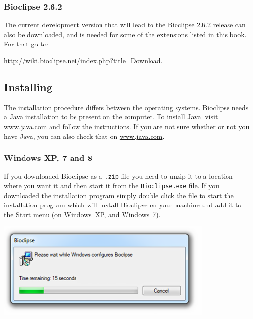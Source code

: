 \documentclass[a5paper, 10pt]{memoir}
\begin{document}
\begin{refsection}
\subsubsection{Bioclipse 2.6.2}

The current development version that will lead to the Bioclipse 2.6.2 release
can also be downloaded, and is needed for some of the extensions listed
in this book. For that go to:

\baselineskip
{\footnotesize \noindent \url{http://wiki.bioclipse.net/index.php?title=Download}.}


\subsection{Installing}
The installation procedure differs between the operating systems. Bioclipse
needs a Java installation to be present on the computer. To install Java, visit
\url{www.java.com} and follow the instructions. If you are not sure whether or
not you have Java, you can also check that on \url{www.java.com}.

\subsubsection{Windows XP, 7 and 8}
If you downloaded Bioclipse as a \texttt{.zip} file you need to unzip it to a
location where you want it and then start it from the \texttt{Bioclipse.exe}
file. If you downloaded the installation program simply double click the file
to start the installation program which will install Bioclipse on your machine
and add it to the Start menu (on Windows~XP, and Windows~7).
\begin{center}
\includegraphics[width=0.8\textwidth]{images/WindowsInstaller.png}
\end{center}

\end{refsection}
\end{document}
